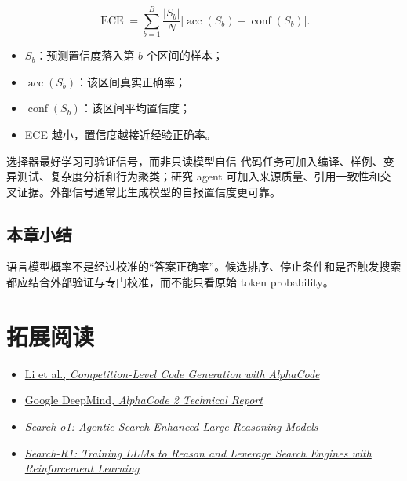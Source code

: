 \documentclass[a4paper]{article}
\begin{document}
$$
\operatorname{ECE}=\sum_{b=1}^{B}\frac{|S_b|}{N}
\left|\operatorname{acc}(S_b)-\operatorname{conf}(S_b)\right|.
$$

\begin{itemize}
    \item $S_b$：预测置信度落入第 $b$ 个区间的样本；
    \item $\operatorname{acc}(S_b)$：该区间真实正确率；
    \item $\operatorname{conf}(S_b)$：该区间平均置信度；
    \item ECE 越小，置信度越接近经验正确率。
\end{itemize}

\begin{knowledgebox}{选择器最好学习可验证信号，而非只读模型自信}
代码任务可加入编译、样例、变异测试、复杂度分析和行为聚类；研究 agent 可加入来源质量、引用一致性和交叉证据。外部信号通常比生成模型的自报置信度更可靠。
\end{knowledgebox}

\subsection{本章小结}

语言模型概率不是经过校准的“答案正确率”。候选排序、停止条件和是否触发搜索都应结合外部验证与专门校准，而不能只看原始 token probability。

\section{拓展阅读}

\begin{itemize}
    \item \href{https://arxiv.org/abs/2203.07814}{Li et al., \emph{Competition-Level Code Generation with AlphaCode}}
    \item \href{https://storage.googleapis.com/deepmind-media/AlphaCode2/AlphaCode2_Tech_Report.pdf}{Google DeepMind, \emph{AlphaCode 2 Technical Report}}
    \item \href{https://arxiv.org/search/?query=Search-o1%3A+Agentic+Search-Enhanced+Large+Reasoning+Models\&searchtype=all}{\emph{Search-o1: Agentic Search-Enhanced Large Reasoning Models}}
    \item \href{https://arxiv.org/search/?query=Search-R1\&searchtype=all}{\emph{Search-R1: Training LLMs to Reason and Leverage Search Engines with Reinforcement Learning}}
\end{itemize}
\end{document}
